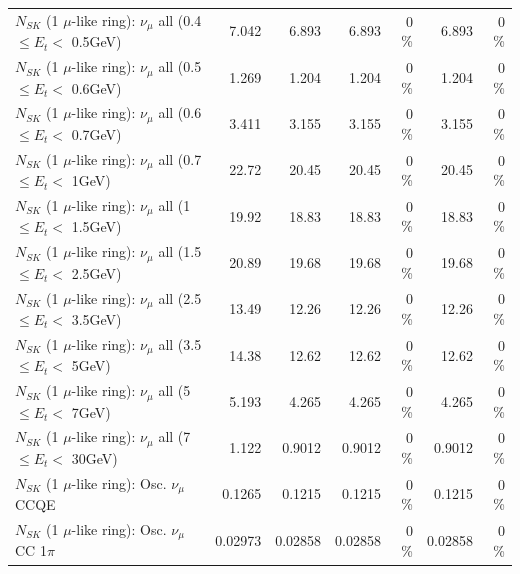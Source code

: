\begin{table}
\begin{tabular}{| l | r | r | r  r | r  r |}
       $N_{SK}$ (1 $\mu$-like ring): $\nu_{\mu}$ all (0.4 $\leq E_{t} <$ 0.5GeV) &           7.042 &           6.893 &           6.893 &        0 \%  &           6.893 &        0 \%  \\ 
       $N_{SK}$ (1 $\mu$-like ring): $\nu_{\mu}$ all (0.5 $\leq E_{t} <$ 0.6GeV) &           1.269 &           1.204 &           1.204 &        0 \%  &           1.204 &        0 \%  \\ 
       $N_{SK}$ (1 $\mu$-like ring): $\nu_{\mu}$ all (0.6 $\leq E_{t} <$ 0.7GeV) &           3.411 &           3.155 &           3.155 &        0 \%  &           3.155 &        0 \%  \\ 
         $N_{SK}$ (1 $\mu$-like ring): $\nu_{\mu}$ all (0.7 $\leq E_{t} <$ 1GeV) &           22.72 &           20.45 &           20.45 &        0 \%  &           20.45 &        0 \%  \\ 
         $N_{SK}$ (1 $\mu$-like ring): $\nu_{\mu}$ all (1 $\leq E_{t} <$ 1.5GeV) &           19.92 &           18.83 &           18.83 &        0 \%  &           18.83 &        0 \%  \\ 
       $N_{SK}$ (1 $\mu$-like ring): $\nu_{\mu}$ all (1.5 $\leq E_{t} <$ 2.5GeV) &           20.89 &           19.68 &           19.68 &        0 \%  &           19.68 &        0 \%  \\ 
       $N_{SK}$ (1 $\mu$-like ring): $\nu_{\mu}$ all (2.5 $\leq E_{t} <$ 3.5GeV) &           13.49 &           12.26 &           12.26 &        0 \%  &           12.26 &        0 \%  \\ 
         $N_{SK}$ (1 $\mu$-like ring): $\nu_{\mu}$ all (3.5 $\leq E_{t} <$ 5GeV) &           14.38 &           12.62 &           12.62 &        0 \%  &           12.62 &        0 \%  \\ 
           $N_{SK}$ (1 $\mu$-like ring): $\nu_{\mu}$ all (5 $\leq E_{t} <$ 7GeV) &           5.193 &           4.265 &           4.265 &        0 \%  &           4.265 &        0 \%  \\ 
          $N_{SK}$ (1 $\mu$-like ring): $\nu_{\mu}$ all (7 $\leq E_{t} <$ 30GeV) &           1.122 &          0.9012 &          0.9012 &        0 \%  &          0.9012 &        0 \%  \\ 
\hline
\hline
                               $N_{SK}$ (1 $\mu$-like ring): Osc. $\nu_\mu$ CCQE &          0.1265 &          0.1215 &          0.1215 &        0 \%  &          0.1215 &        0 \%  \\ 
                          $N_{SK}$ (1 $\mu$-like ring): Osc. $\nu_\mu$ CC 1$\pi$ &         0.02973 &         0.02858 &         0.02858 &        0 \%  &         0.02858 &        0 \%  \\ 

\end{tabular}
\end{table}
